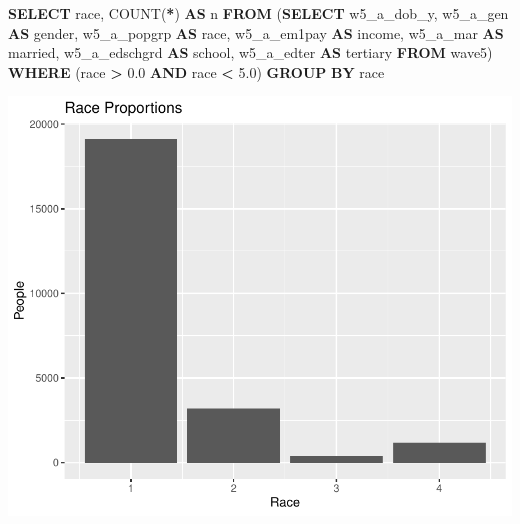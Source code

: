 \documentclass[11pt,preprint, authoryear]{elsarticle}
\numberwithin{equation}{section}
\numberwithin{figure}{section}
\numberwithin{table}{section}
\newenvironment{Shaded}{\begin{snugshade}}{\end{snugshade}}
\newcommand{\FloatTok}[1]{\textcolor[rgb]{0.00,0.00,0.81}{#1}}
\newcommand{\FunctionTok}[1]{\textcolor[rgb]{0.00,0.00,0.00}{#1}}
\newcommand{\KeywordTok}[1]{\textcolor[rgb]{0.13,0.29,0.53}{\textbf{#1}}}
\newcommand{\NormalTok}[1]{#1}
\newcommand{\OperatorTok}[1]{\textcolor[rgb]{0.81,0.36,0.00}{\textbf{#1}}}
\begin{document}
\begin{Shaded}
\begin{Highlighting}[]
\KeywordTok{SELECT}\NormalTok{ \textasciigrave{}race\textasciigrave{}, }\FunctionTok{COUNT}\NormalTok{(}\OperatorTok{*}\NormalTok{) }\KeywordTok{AS}\NormalTok{ \textasciigrave{}n\textasciigrave{}}
\KeywordTok{FROM}\NormalTok{ (}\KeywordTok{SELECT}\NormalTok{ \textasciigrave{}w5\_a\_dob\_y\textasciigrave{}, \textasciigrave{}w5\_a\_gen\textasciigrave{} }\KeywordTok{AS}\NormalTok{ \textasciigrave{}gender\textasciigrave{}, \textasciigrave{}w5\_a\_popgrp\textasciigrave{} }\KeywordTok{AS}\NormalTok{ \textasciigrave{}race\textasciigrave{}, }
\NormalTok{\textasciigrave{}w5\_a\_em1pay\textasciigrave{} }\KeywordTok{AS}\NormalTok{ \textasciigrave{}income\textasciigrave{}, \textasciigrave{}w5\_a\_mar\textasciigrave{} }\KeywordTok{AS}\NormalTok{ \textasciigrave{}married\textasciigrave{}, \textasciigrave{}w5\_a\_edschgrd\textasciigrave{} }\KeywordTok{AS}\NormalTok{ \textasciigrave{}school\textasciigrave{}, }
\NormalTok{\textasciigrave{}w5\_a\_edter\textasciigrave{} }\KeywordTok{AS}\NormalTok{ \textasciigrave{}tertiary\textasciigrave{} }\KeywordTok{FROM}\NormalTok{ \textasciigrave{}wave5\textasciigrave{}) }\KeywordTok{WHERE}\NormalTok{ (\textasciigrave{}race\textasciigrave{} }\OperatorTok{\textgreater{}} \FloatTok{0.0} \KeywordTok{AND}\NormalTok{ \textasciigrave{}race\textasciigrave{} }\OperatorTok{\textless{}} \FloatTok{5.0}\NormalTok{)}
\KeywordTok{GROUP} \KeywordTok{BY}\NormalTok{ \textasciigrave{}race\textasciigrave{}}
\end{Highlighting}
\end{Shaded}

\includegraphics{20346212MLProject_files/figure-latex/unnamed-chunk-3-1.pdf}
\end{document}
